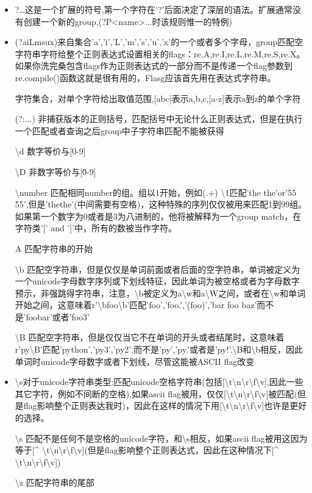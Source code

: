 \documentclass{book}
\begin{document}
\begin{itemize}
\item ?\ldots 这是一个扩展的符号,第一个字符在'?'后面决定了深层的语法。扩展通常没有创建一个新的group,(?P<name>$\ldots$时该规则惟一的特例)
\item (?aiLmsux)来自集合'a','i','L','m','s','u','x'的一个或者多个字母，group匹配空字符串字符给整个正则表达式设置相关的flags：re.A,re.I,re.L,re.M,re.S,re.X。如果你洗完桑包含flags作为正则表达式的一部分而不是传递一个flag参数到re.compile()函数这就是很有用的，Flasg应该首先用在表达式字符串。
\item [ ]字符集合，对单个字符给出取值范围,[abc]表示a,b,c,[a-z]表示a到z的单个字符
\item [(?:...)] 非捕获版本的正则括号，匹配括号中无论什么正则表达式，但是在执行一个匹配或者查询之后group中子字符串匹配不能被获得
\item[\textbackslash d] 数字等价与[0-9]
 \item[\textbackslash D] 非数字等价与[\^0-9]
 \item[\textbackslash number] 匹配相同number的组。组以1开始，例如(.+) \textbackslash1匹配'the the'or'55 55',但是'thethe'(中间需要有空格)，这种特殊的序列仅仅被用来匹配1到99组。如果第一个数字为0或者是3为八进制的，他将被解释为一个group match，在字符类'[' and ']'中，所有的数被当作字符。
 \item[A] 匹配字符串的开始
 \item[\textbackslash b] 匹配空字符串，但是仅仅是单词前面或者后面的空字符串，单词被定义为一个unicode字母数字序列或下划线特征，因此单词为被空格或者为字母数字预示，非强跳得字符串，注意，\textbackslash b被定义为a\textbackslash w和a\textbackslash W之间，或者在\textbackslash w和单词开始之间，这意味着r'\textbackslash bfoo\textbackslash b'匹配'foo','foo.','(foo)','bar foo baz'而不是'foobar'或者'foo3'
 \item[\textbackslash B]匹配空字符串，但是仅仅当它不在单词的开头或者结尾时，这意味着r'py\textbackslash B'匹配'python','py3','py2',而不是'py','py.'或者是'py!'.\textbackslash B和\textbackslash b相反，因此单词时unicode字母数字或者下划线，尽管这能被ASCII flag改变
 \item \textbackslash s对于unicode字符串类型:匹配unicode空格字符串(包括[\textbackslash t\textbackslash n\textbackslash r\textbackslash f\textbackslash v],因此一些其它字符，例如不间断的空格),如果ascii flag被用，仅仅[\textbackslash t\textbackslash n\textbackslash r\textbackslash f\textbackslash v]被匹配(但是flag影响整个正则表达我时)，因此在这样的情况下用[\textbackslash t\textbackslash n\textbackslash r\textbackslash f\textbackslash v]也许是更好的选择。
 \item[\textbackslash s] 匹配不是任何不是空格的unicode字符，和\textbackslash s相反，如果ascii flag被用这因为等于[\^{} \textbackslash t\textbackslash n\textbackslash r\textbackslash f\textbackslash v](但是flag影响整个正则表达式，因此在这种情况下[\^{} \textbackslash t\textbackslash n\textbackslash r\textbackslash f\textbackslash v])
\item [\textbackslash z]匹配字符串的尾部
\end{itemize}
\newpage
\end{document}
